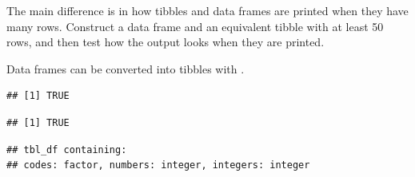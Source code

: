 \documentclass[krantz2]{krantz}\usepackage{knitr}%
\begin{document}
\begin{playground}
The main difference is in how tibbles and data frames are printed when they have many rows. Construct a data frame and an equivalent tibble with at least 50 rows, and then test how the output looks when they are printed.
\end{playground}

Data frames can be converted into tibbles with .

\begin{knitrout}\footnotesize
{}\color{fgcolor}\begin{kframe}
\begin{alltt}
 \hlkwb{<-} 
\end{alltt}


{\ttfamily\noindent\color{warningcolor}{\#\# Warning: `as.tibble()` is deprecated, use `as\_tibble()` (but mind the new semantics).\\\#\# This warning is displayed once per session.}}\begin{alltt}
\end{alltt}
\begin{verbatim}
## [1] TRUE
\end{verbatim}
\begin{alltt}
\end{alltt}
\begin{verbatim}
## [1] TRUE
\end{verbatim}
\begin{alltt}
\end{alltt}
\begin{verbatim}
## tbl_df containing:
## codes: factor, numbers: integer, integers: integer
\end{verbatim}
\end{kframe}
\end{knitrout}
\end{document}
